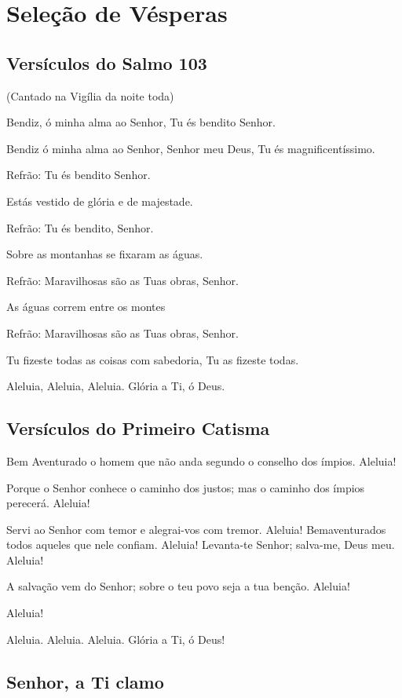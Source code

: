 \documentclass{subfiles}
\begin{document}
\chapter{Seleção de Vésperas}

\section*{Versículos do Salmo 103}

(Cantado na Vigília da noite toda)

Bendiz, ó minha alma ao Senhor, Tu és bendito Senhor.

Bendiz ó minha alma ao Senhor, Senhor meu Deus, Tu és magnificentíssimo.

Refrão: Tu és bendito Senhor.

Estás vestido de glória e de majestade.

Refrão: Tu és bendito, Senhor.

Sobre as montanhas se fixaram as águas.

Refrão: Maravilhosas são as Tuas obras, Senhor.

As águas correm entre os montes

Refrão: Maravilhosas são as Tuas obras, Senhor.

Tu fizeste todas as coisas com sabedoria, Tu as fizeste todas.

\Doxology{}

Aleluia, Aleluia, Aleluia. Glória a Ti, ó Deus. \thrice{}

\section*{Versículos do Primeiro Catisma}

Bem Aventurado o homem que não anda segundo o conselho dos ímpios. Aleluia!

Porque o Senhor conhece o caminho dos justos; mas o caminho dos ímpios perecerá.
Aleluia!

Servi ao Senhor com temor e alegrai-vos com tremor. Aleluia! Bemaventurados
todos aqueles que nele confiam. Aleluia! Levanta-te Senhor; salva-me, Deus meu.
Aleluia!

A salvação vem do Senhor; sobre o teu povo seja a tua benção. Aleluia!

\Doxology{} Aleluia!

Aleluia. Aleluia. Aleluia. Glória a Ti, ó Deus! \thrice{}

\section*{Senhor, a Ti clamo}
\end{document}
